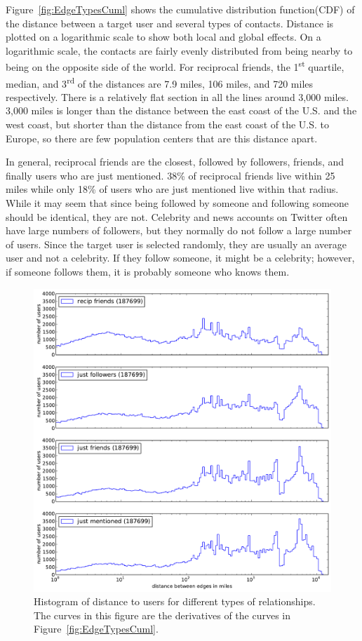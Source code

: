 Figure~\ref{fig:EdgeTypesCuml} shows the cumulative distribution
function(CDF) of the distance between a target user and several types of
contacts.
%
Distance is plotted on a logarithmic scale to show both local and
global effects.
%
On a logarithmic scale, the contacts are fairly evenly distributed from being
nearby to being on the opposite side of the world.
%
For reciprocal friends, the 1\textsuperscript{st} quartile, median, and
3\textsuperscript{rd} of the distances are 7.9 miles, 106 miles, and 720 miles
respectively.
%
There is a relatively flat section in all the lines around 3,000 miles.
%
3,000 miles is longer than the distance between the east coast of the U.S. and
the west coast, but shorter than the distance from the east coast of the U.S.
to Europe, so there are few population centers that are this distance apart.

In general, reciprocal friends are the closest, followed by followers, friends,
and finally users who are just mentioned.
%
38\% of reciprocal friends live within 25 miles while only 18\% of users
who are just mentioned live within that radius.
%
While it may seem that since being followed by someone and following someone
should be identical, they are not.
%
Celebrity and news accounts on Twitter often have large numbers of followers,
but they normally do not follow a large number of users.
%
Since the target user is selected randomly, they are usually an average
user and not a celebrity.
%
If they follow someone, it might be a celebrity; however, if someone follows
them, it is probably someone who knows them.

\begin{figure}[tbh]
\centering
\includegraphics[width=.7\linewidth]{figures/edge_types_norm.pdf}
\caption{
Histogram of distance to users for different types of relationships.
The curves in this figure are the derivatives of the curves in
Figure~\ref{fig:EdgeTypesCuml}.
}
\label{fig:EdgeTypes}
\end{figure}

